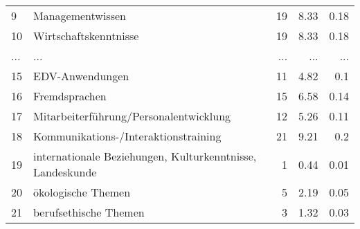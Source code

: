 \begin{longtable}{lXrrr}
        9 & \multicolumn{1}{X}{Managementwissen} & %
          \num{19} &
          \num[round-mode=places,round-precision=2]{8,33} &
          \num[round-mode=places,round-precision=2]{0,18} \\
        10 & \multicolumn{1}{X}{Wirtschaftskenntnisse} & %
          \num{19} &
          \num[round-mode=places,round-precision=2]{8,33} &
          \num[round-mode=places,round-precision=2]{0,18} \\
       ... & ... & ... & ... & ... \\
        15 & \multicolumn{1}{X}{EDV-Anwendungen} & %
          \num{11} &
          \num[round-mode=places,round-precision=2]{4,82} &
          \num[round-mode=places,round-precision=2]{0,1} \\

        16 & \multicolumn{1}{X}{Fremdsprachen} & %
          \num{15} &
          \num[round-mode=places,round-precision=2]{6,58} &
          \num[round-mode=places,round-precision=2]{0,14} \\

        17 & \multicolumn{1}{X}{Mitarbeiterführung/Personalentwicklung} & %
          \num{12} &
          \num[round-mode=places,round-precision=2]{5,26} &
          \num[round-mode=places,round-precision=2]{0,11} \\

        18 & \multicolumn{1}{X}{Kommunikations-/Interaktionstraining} & %
          \num{21} &
          \num[round-mode=places,round-precision=2]{9,21} &
          \num[round-mode=places,round-precision=2]{0,2} \\

        19 & \multicolumn{1}{X}{internationale Beziehungen, Kulturkenntnisse, Landeskunde} & %
          \num{1} &
          \num[round-mode=places,round-precision=2]{0,44} &
          \num[round-mode=places,round-precision=2]{0,01} \\

        20 & \multicolumn{1}{X}{ökologische Themen} & %
          \num{5} &
          \num[round-mode=places,round-precision=2]{2,19} &
          \num[round-mode=places,round-precision=2]{0,05} \\

        21 & \multicolumn{1}{X}{berufsethische Themen} & %
          \num{3} &
          \num[round-mode=places,round-precision=2]{1,32} &
          \num[round-mode=places,round-precision=2]{0,03} \\


\end{longtable}
